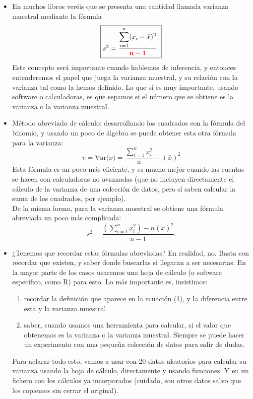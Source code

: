\begin{itemize}
    \item En muchos libros veréis que se presenta una cantidad llamada {\sf varianza muestral} mediante la fórmula
            \[\fbox{$s^2=\dfrac{\displaystyle\sum_{i=1}^n(x_i-\bar x)^2}{\textcolor{red}{\bf n-1}}.$}\]
            Este concepto será importante cuando hablemos de inferencia, y entonces entenderemos el papel que juega la varianza muestral, y su relación con la varianza tal como la hemos definido. Lo que sí es {\sf\large muy importante}, usando software o calculadoras, es que sepamos si el número que se obtiene es la varianza o la varianza muestral.

     \item {\sf Método abreviado de cálculo:} desarrollando los cuadrados con la fórmula del binomio, y usando un poco de álgebra se puede obtener esta otra fórmula para la varianza:
           \[v=\mbox{Var($x$)}=\dfrac{\displaystyle\sum_{i=1}^n x_i^2}{n}-(\bar x)^2\]
           Esta fórmula es un poco más eficiente, y es mucho mejor cuando las cuentas se hacen con calculadoras no avanzadas (que no incluyen directamente el cálculo de la varianza de una colección de datos, pero sí saben calcular la suma de los cuadrados, por ejemplo). \\

           De la misma forma, para la varianza muestral se obtiene una fórmula abreviada un poco más complicada:
           \[s^2=\dfrac{\displaystyle\left(\sum_{i=1}^n x_i^2\right)-n(\bar x)^2}{n-1}.\]

     \item ¿Tenemos que recordar estas fórmulas abreviadas? En realidad, no. Basta con recordar que existen, y saber donde buscarlas si llegaran a ser necesarias. En la mayor parte de los casos usaremos una hoja de cálculo (o software específico, como R) para esto. Lo más importante es, insistimos:
            \begin{enumerate}
            \item recordar la definición que aparece en la ecuación (1), y la diferencia entre esta y la varianza muestral
            \item saber, cuando usamos una herramienta para calcular, si el valor que obtenemos es la varianza o la varianza muestral. Siempre se puede hacer un experimento con una pequeña colección de datos para salir de dudas.
            \end{enumerate}
           Para aclarar todo esto, vamos a usar  con 20 datos aleatorios para calcular su varianza usando la hoja de cálculo, directamente y usando funciones. Y en   un fichero con los cálculos ya incorporados (cuidado, son otros datos salvo que los copiemos sin cerrar el original).


\end{itemize}
